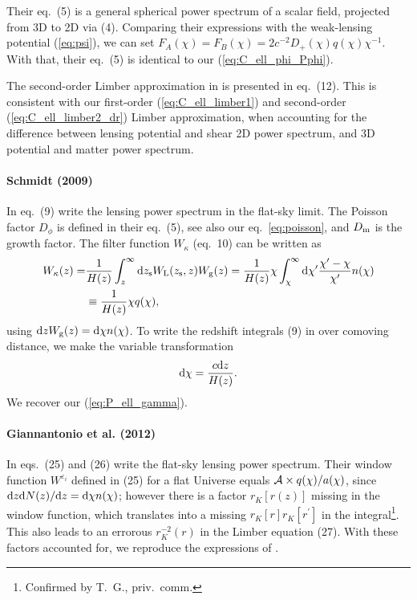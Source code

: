 \documentclass[fleqn,usenatbib]{mnras} %
\newcommand{\pref}{{\cal A}}
\begin{document}
\begin{appendix}
Their eq.~(5) is a general spherical power spectrum of a scalar field,
projected from 3D to 2D via (4). Comparing their expressions with the
weak-lensing potential (\ref{eq:psi}), we can set $F_A(\chi) = F_B(\chi) = 2
c^{-2} D_+(\chi) q(\chi) \chi^{-1}$. With that, their eq.~(5) is identical to
our (\ref{eq:C_ell_phi_Pphi}).

The second-order Limber approximation in \cite{2008PhRvD..78l3506L} is presented in
eq.~(12). This is consistent with our first-order (\ref{eq:C_ell_limber1}) and
second-order (\ref{eq:C_ell_limber2_dr}) Limber approximation, when accounting for the difference between
lensing potential and shear 2D power spectrum, and 3D potential and matter power spectrum.


\paragraph{Schmidt (2009)}

In eq.~(9) \cite{2008PhRvD..78d3002S} write the lensing power spectrum in the
flat-sky limit. The Poisson factor $D_\phi$ is defined in their eq.~(5), see
also our eq.~\ref{eq:poisson}, and $D_{\rm m}$ is the growth factor. The filter
function $W_\kappa$ (eq.~10) can be written as
%
\begin{align}
  W_\kappa(z) = & \frac 1 {H(z)} \int_z^\infty {\rm d} z_{\rm s} W_{\rm L}(z_{\rm s}, z) W_{\rm g}(z)
              =  \frac 1 {H(z)} \chi \int_\chi^\infty {\rm d} \chi^\prime \frac{\chi^\prime - \chi}{\chi^\prime}
                n(\chi)
              \nonumber \\
              & \equiv \frac 1 {H(z)} \chi q(\chi),
\end{align}
%
using ${\rm d} z W_{\rm g}(z) = {\rm d} \chi n(\chi)$.
To write the redshift integrals (9) in \cite{2008PhRvD..78d3002S} over 
comoving distance, we make the variable transformation
%
\begin{equation}
  {\rm d} \chi = \frac{c {\rm d} z}{H(z)} .
\end{equation}
%
We recover our (\ref{eq:P_ell_gamma}).

\paragraph{Giannantonio et al. (2012)}

In eqs.~(25) and (26) \cite{2012MNRAS.422.2854G} write the flat-sky lensing
power spectrum. Their window function $W^{\varepsilon_i}$ defined in (25) for a
flat Universe equals $\pref \times q(\chi) / a(\chi)$, since ${\rm d} z {\rm d}
N(z)/{\rm d} z = {\rm d} \chi n(\chi)$; however there is a factor $r_K[r(z)]$
missing in the window function, which translates into a missing $r_K[r]
r_K[r^\prime]$ in the integral\footnote{Confirmed by T.~G., priv.~comm.}. This
also leads to an errorous $r_K^{-2}(r)$ in the Limber equation (27). With these
factors accounted for, we reproduce the expressions of \cite{2012MNRAS.422.2854G}.


\label{lastpage}

\end{appendix}
\end{document}
